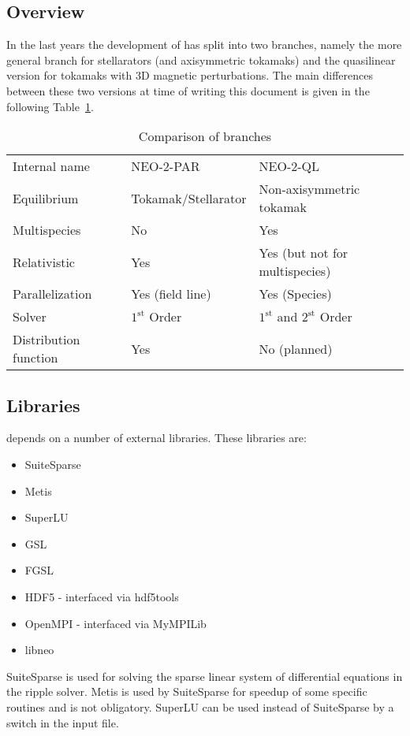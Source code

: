 \documentclass{article}
\newcommand{\vv}[1]{\texttt{\detokenize{#1}}}
\begin{document}
\subsection{Overview}
In the last years the development of \vv{neo-2} has split into two branches,
namely the more general branch for stellarators (and axisymmetric
tokamaks) and the quasilinear version for tokamaks with 3D magnetic
perturbations. The main differences between these two versions at time
of writing this document is given in the following Table~\ref{tab:neo2branches}.

\begin{table}[h]
\centering
\begin{tabular}{lll}
Internal name   & NEO-2-PAR & NEO-2-QL\\
Equilibrium     & Tokamak/Stellarator & Non-axisymmetric tokamak\\
Multispecies    & No & Yes\\
Relativistic    & Yes & Yes (but not for multispecies)\\
Parallelization & Yes (field line) & Yes (Species)\\
Solver          & $1^\mathrm{st}$ Order & $1^\mathrm{st}$ and $2^\mathrm{st}$ Order\\
Distribution function & Yes & No (planned)
\end{tabular}
\caption{Comparison of \vv{neo-2} branches}
\label{tab:neo2branches}
\end{table}

\subsection{Libraries\label{technicalbackground_libraries}}
\vv{neo-2} depends on a number of external libraries. These libraries
are:
\begin{itemize}
\item SuiteSparse
\item Metis
\item SuperLU
\item GSL
\item FGSL
\item HDF5 - interfaced via hdf5tools
\item OpenMPI - interfaced via MyMPILib
\item libneo
\end{itemize}

SuiteSparse is used for solving the sparse linear system of differential
equations in the ripple solver. Metis is used by SuiteSparse for speedup
of some specific routines and is not obligatory. SuperLU can be used
instead of SuiteSparse by a switch in the input file.
\end{document}
